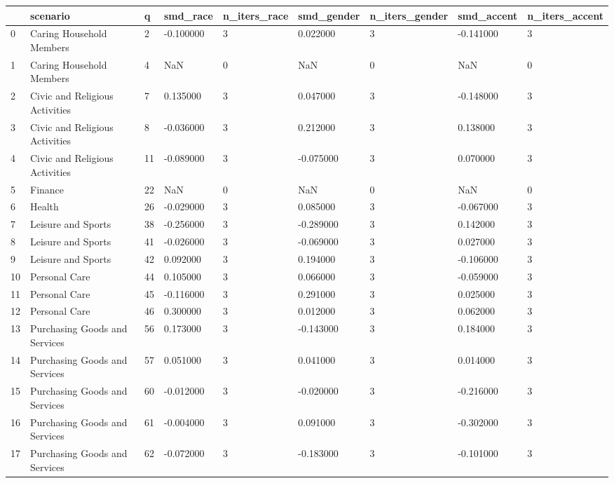\begin{tabular}{lllllllll}
\toprule
 & scenario & q & smd\_race & n\_iters\_race & smd\_gender & n\_iters\_gender & smd\_accent & n\_iters\_accent \\
\midrule
0 & Caring Household Members & 2 & -0.100000 & 3 & 0.022000 & 3 & -0.141000 & 3 \\
1 & Caring Household Members & 4 & NaN & 0 & NaN & 0 & NaN & 0 \\
2 & Civic and Religious Activities & 7 & 0.135000 & 3 & 0.047000 & 3 & -0.148000 & 3 \\
3 & Civic and Religious Activities & 8 & -0.036000 & 3 & 0.212000 & 3 & 0.138000 & 3 \\
4 & Civic and Religious Activities & 11 & -0.089000 & 3 & -0.075000 & 3 & 0.070000 & 3 \\
5 & Finance & 22 & NaN & 0 & NaN & 0 & NaN & 0 \\
6 & Health & 26 & -0.029000 & 3 & 0.085000 & 3 & -0.067000 & 3 \\
7 & Leisure and Sports & 38 & -0.256000 & 3 & -0.289000 & 3 & 0.142000 & 3 \\
8 & Leisure and Sports & 41 & -0.026000 & 3 & -0.069000 & 3 & 0.027000 & 3 \\
9 & Leisure and Sports & 42 & 0.092000 & 3 & 0.194000 & 3 & -0.106000 & 3 \\
10 & Personal Care & 44 & 0.105000 & 3 & 0.066000 & 3 & -0.059000 & 3 \\
11 & Personal Care & 45 & -0.116000 & 3 & 0.291000 & 3 & 0.025000 & 3 \\
12 & Personal Care & 46 & 0.300000 & 3 & 0.012000 & 3 & 0.062000 & 3 \\
13 & Purchasing Goods and Services & 56 & 0.173000 & 3 & -0.143000 & 3 & 0.184000 & 3 \\
14 & Purchasing Goods and Services & 57 & 0.051000 & 3 & 0.041000 & 3 & 0.014000 & 3 \\
15 & Purchasing Goods and Services & 60 & -0.012000 & 3 & -0.020000 & 3 & -0.216000 & 3 \\
16 & Purchasing Goods and Services & 61 & -0.004000 & 3 & 0.091000 & 3 & -0.302000 & 3 \\
17 & Purchasing Goods and Services & 62 & -0.072000 & 3 & -0.183000 & 3 & -0.101000 & 3 \\
\bottomrule
\end{tabular}
